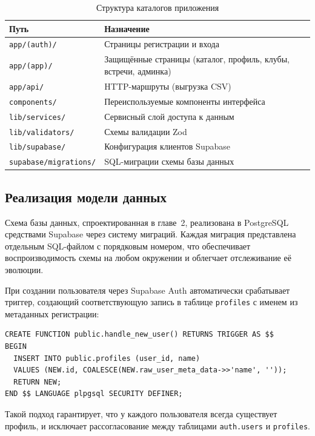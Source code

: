 \begin{table}[h]
\centering
\caption{Структура каталогов приложения}
\label{tab:structure}
\begin{tabular}{|p{5cm}|p{9cm}|}
\hline
\textbf{Путь} & \textbf{Назначение} \\
\hline
\texttt{app/(auth)/} & Страницы регистрации и входа \\
\hline
\texttt{app/(app)/} & Защищённые страницы (каталог, профиль, клубы, встречи, админка) \\
\hline
\texttt{app/api/} & HTTP-маршруты (выгрузка CSV) \\
\hline
\texttt{components/} & Переиспользуемые компоненты интерфейса \\
\hline
\texttt{lib/services/} & Сервисный слой доступа к данным \\
\hline
\texttt{lib/validators/} & Схемы валидации Zod \\
\hline
\texttt{lib/supabase/} & Конфигурация клиентов Supabase \\
\hline
\texttt{supabase/migrations/} & SQL-миграции схемы базы данных \\
\hline
\end{tabular}
\end{table}

\subsection{Реализация модели данных}

Схема базы данных, спроектированная в главе~2, реализована в PostgreSQL
средствами Supabase через систему миграций. Каждая миграция представлена
отдельным SQL-файлом с порядковым номером, что обеспечивает воспроизводимость
схемы на любом окружении и облегчает отслеживание её эволюции.

При создании пользователя через Supabase Auth автоматически срабатывает
триггер, создающий соответствующую запись в таблице \texttt{profiles}
с именем из метаданных регистрации:

\begin{verbatim}
CREATE FUNCTION public.handle_new_user() RETURNS TRIGGER AS $$
BEGIN
  INSERT INTO public.profiles (user_id, name)
  VALUES (NEW.id, COALESCE(NEW.raw_user_meta_data->>'name', ''));
  RETURN NEW;
END $$ LANGUAGE plpgsql SECURITY DEFINER;
\end{verbatim}

Такой подход гарантирует, что у каждого пользователя всегда существует
профиль, и исключает рассогласование между таблицами \texttt{auth.users}
и \texttt{profiles}.

